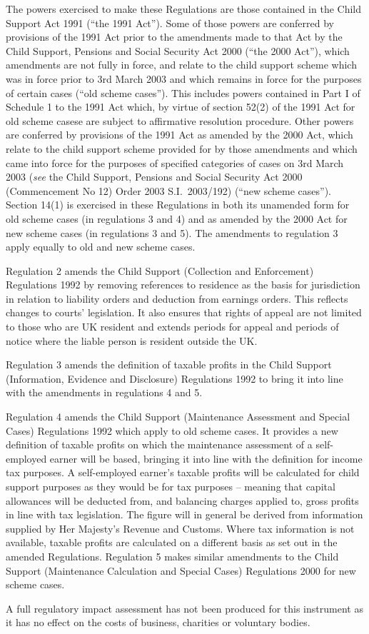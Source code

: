 \documentclass[12pt,a4paper]{article}
\begin{document}
The powers exercised to make these Regulations are those contained in the Child Support Act 1991 (“the 1991 Act”). Some of those powers are conferred by provisions of the 1991 Act prior to the amendments made to that Act by the Child Support, Pensions and Social Security Act 2000 (“the 2000 Act”), which amendments are not fully in force, and relate to the child support scheme which was in force prior to 3rd March 2003 and which remains in force for the purposes of certain cases (“old scheme cases”). This includes powers contained in Part I of Schedule 1 to the 1991 Act which, by virtue of section 52(2) of the 1991 Act for old scheme casese are subject to affirmative resolution procedure. Other powers are conferred by provisions of the 1991 Act as amended by the 2000 Act, which relate to the child support scheme provided for by those amendments and which came into force for the purposes of specified categories of cases on 3rd March 2003 (\emph{see} the Child Support, Pensions and Social Security Act 2000 (Commencement No 12) Order 2003 S.I.\ 2003/192) (“new scheme cases”). Section 14(1) is exercised in these Regulations in both its unamended form for old scheme cases (in regulations 3 and 4) and as amended by the 2000 Act for new scheme cases (in regulations 3 and 5). The amendments to regulation 3 apply equally to old and new scheme cases.

Regulation 2 amends the Child Support (Collection and Enforcement) Regulations 1992 by removing references to residence as the basis for jurisdiction in relation to liability orders and deduction from earnings orders. This reflects changes to courts’ legislation. It also ensures that rights of appeal are not limited to those who are UK resident and extends periods for appeal and periods of notice where the liable person is resident outside the UK.

Regulation 3 amends the definition of taxable profits in the Child Support (Information, Evidence and Disclosure) Regulations 1992 to bring it into line with the amendments in regulations 4 and 5.

Regulation 4 amends the Child Support (Maintenance Assessment and Special Cases) Regulations 1992 which apply to old scheme cases. It provides a new definition of taxable profits on which the maintenance assessment of a self-employed earner will be based, bringing it into line with the definition for income tax purposes. A self-employed earner’s taxable profits will be calculated for child support purposes as they would be for tax purposes – meaning that capital allowances will be deducted from, and balancing charges applied to, gross profits in line with tax legislation. The figure will in general be derived from information supplied by Her Majesty’s Revenue and Customs. Where tax information is not available, taxable profits are calculated on a different basis as set out in the amended Regulations. Regulation 5 makes similar amendments to the Child Support (Maintenance Calculation and Special Cases) Regulations 2000 for new scheme cases.

A full regulatory impact assessment has not been produced for this instrument as it has no effect on the costs of business, charities or voluntary bodies. 
\end{document}
